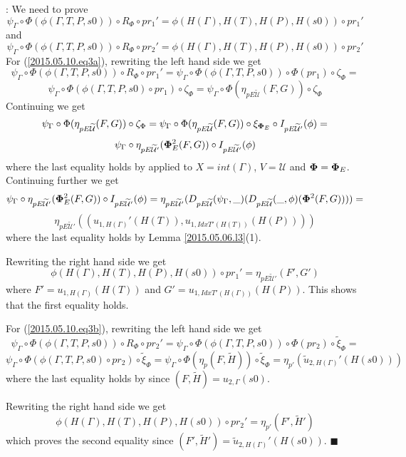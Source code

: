 \documentclass[12pt]{article}
\numberwithin{equation}{section}
\newenvironment{eq}{\begin{equation}}{\end{equation}}
\newenvironment{myproof}{{\bf Proof}:}{$\blacksquare$ \vskip 5mm }
\newcommand{\llabel}[1]{\label{#1}}
\newcommand{\wt}{\widetilde}
\newcommand{\U}{\mathcal{U}}
\begin{document}
\begin{myproof}
We need to prove
%
\begin{eq}
\llabel{2015.05.10.eq3a} \psi_{\Gamma}\circ \Phi(\phi(\Gamma,T,P,s0))\circ
R_{\Phi}\circ pr_1' = \phi(H(\Gamma),H(T),H(P),H(s0))\circ pr_1'
\end{eq}
%
and
%
%
\begin{eq}
\llabel{2015.05.10.eq3b} \psi_{\Gamma}\circ \Phi(\phi(\Gamma,T,P,s0))\circ
R_{\Phi}\circ pr_2' = \phi(H(\Gamma),H(T),H(P),H(s0))\circ pr_2'
\end{eq}
%
For (\ref{2015.05.10.eq3a}), rewriting the left hand side we get
%
$$\psi_{\Gamma}\circ \Phi(\phi(\Gamma,T,P,s0))\circ R_{\Phi}\circ pr_1' =
\psi_{\Gamma}\circ \Phi(\phi(\Gamma,T,P,s0))\circ\Phi(pr_1)\circ
\zeta_{\Phi}=$$
$$\psi_{\Gamma}\circ \Phi(\phi(\Gamma,T,P,s0)\circ pr_1)\circ
\zeta_{\Phi}=\psi_{\Gamma}\circ \Phi(\eta_{pE\wt{\U}}(F,G))\circ \zeta_{\Phi}$$
%
Continuing we get
%
$$\psi_{\Gamma}\circ \Phi(\eta_{pE\wt{\U}}(F,G))\circ
\zeta_{\Phi}=\psi_{\Gamma}\circ \Phi(\eta_{pE\wt{\U}}(F,G))\circ \xi_{{\bf
    \Phi}_E}\circ I_{pE\wt{\U}'}(\phi)=$$
$$\psi_{\Gamma}\circ\eta_{pE\wt{\U}'}({\bf\Phi}^2_E(F,G))\circ
I_{pE\wt{\U}'}(\phi)$$
%
where the last equality holds by \cite[Lemma 5.8]{fromunivwithPi} applied to
$X=int(\Gamma)$, $V=\U$ and ${\bf\Phi}={\bf\Phi}_E$. Continuing further we get
%
$$\psi_{\Gamma}\circ\eta_{pE\wt{\U}'}({\bf\Phi}^2_E(F,G))\circ
I_{pE\wt{\U}'}(\phi)=\eta_{pE\wt{\U}'}(D_{pE\wt{\U}}(\psi_{\Gamma},\_)(D_{pE\wt{\U}}(\_,\phi)({\bf\Phi}^2(F,G))))=$$$$\eta_{pE\wt{\U}'}((u_{1,H(\Gamma)}'(H(T)),u_{1,IdxT'(H(T))}(H(P))))$$
%
where the last equality holds by Lemma \ref{2015.05.06.l3}(1).

Rewriting the right hand side we get
%
$$\phi(H(\Gamma),H(T),H(P),H(s0))\circ pr_1'=\eta_{pE\wt{\U}'}(F',G')$$
%
where $F'=u_{1,H(\Gamma)}(H(T))$ and $G'=u_{1,IdxT'(H(\Gamma))}(H(P))$.  This
shows that the first equality holds.

For (\ref{2015.05.10.eq3b}), rewriting the left hand side we get
%
$$\psi_{\Gamma}\circ \Phi(\phi(\Gamma,T,P,s0))\circ R_{\Phi}\circ pr_2' =
\psi_{\Gamma}\circ \Phi(\phi(\Gamma,T,P,s0))\circ \Phi(pr_2)\circ
\wt{\xi}_{\Phi}=$$
$$\psi_{\Gamma}\circ \Phi(\phi(\Gamma,T,P,s0)\circ pr_2)\circ
\wt{\xi}_{\Phi}=\psi_{\Gamma}\circ \Phi(\eta_p(F,\wt{H}))\circ
\wt{\xi}_{\Phi}=\eta_{p'}(\wt{u}_{2,H(\Gamma)}'(H(s0)))$$
%
where the last equality holds by \cite[Lemma 6.2(2)]{fromunivwithPi} since
$(F,\wt{H})=u_{2,\Gamma}(s0)$.

Rewriting the right hand side we get
%
$$\phi(H(\Gamma),H(T),H(P),H(s0))\circ pr_2'=\eta_{p'}(F',\wt{H}')$$
%
which proves the second equality since
$(F',\wt{H}')=\wt{u}_{2,H(\Gamma)}'(H(s0))$.
\end{myproof}





\end{document}
